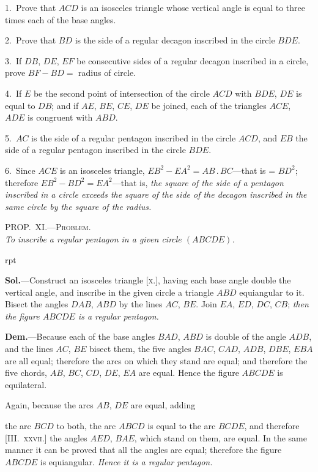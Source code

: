 \documentclass[oneside]{book}
\newcounter{wrapwidth}
\newcommand\myprop[2]{
\bigskip\Needspace*{4\baselineskip}\begin{center}\textsc{#1}\\\medskip\emph{#2}\par\end{center}
}
\newcommand\imgflow[3]{
\setcounter{wrapwidth}{#1}

\begin{wrapfigure}[#2]{r}{\value{wrapwidth}pt}
\begin{center}
\vspace{-0.3in}

\end{center}
\end{wrapfigure}
}
\begin{document}
\begin{footnotesize}
1.~Prove that $ACD$ is an isosceles triangle whose vertical angle
is equal to three times each of the base angles.

2.~Prove that $BD$ is the side of a regular decagon inscribed in
the circle $BDE$.

3.~If $DB$, $DE$, $EF$ be consecutive sides of a regular decagon
inscribed in a circle, prove $BF - BD =$ radius of circle.

4.~If $E$ be the second point of intersection of the circle $ACD$
with $BDE$, $DE$ is equal to $DB$; and if $AE$, $BE$, $CE$, $DE$ be
joined, each of the triangles $ACE$, $ADE$ is congruent with $ABD$.

5.~$AC$ is the side of a regular pentagon inscribed in the circle
$ACD$, and $EB$ the side of a regular pentagon inscribed in the
circle $BDE$.

6.~Since $ACE$ is an isosceles triangle, $EB^{2} - EA^{2} = AB\,.\,BC$---that
is = $BD^{2}$; therefore $EB^{2} - BD^{2} = EA^{2}$---that is, \textit{the square
of the side of a pentagon inscribed in a circle exceeds the square of
the side of the decagon inscribed in the same circle by the square of
the radius.}
\par\end{footnotesize}

\myprop{PROP\@.~XI\@.---Problem.}{To inscribe a regular pentagon in a given circle $(ABCDE)$.}


\imgflow{130}{11}{f163}

\textbf{Sol.}---Construct an isosceles triangle [\textsc{x.}], having
each base angle double the vertical
angle, and inscribe in the
given circle a triangle $ABD$
equiangular to it. Bisect the
angles $DAB$, $ABD$ by the lines
$AC$, $BE$. Join $EA$, $ED$, $DC$,
$CB$; \emph{then the figure $ABCDE$ is
a regular pentagon.}

\textbf{Dem.}---Because each of the
base angles $BAD$, $ABD$ is
double of the angle $ADB$, and the lines $AC$, $BE$ bisect
them, the five angles $BAC$, $CAD$, $ADB$, $DBE$, $EBA$ are
all equal; therefore the arcs on which they stand are
equal; and therefore the five chords, $AB$, $BC$, $CD$, $DE$,
$EA$ are equal. Hence the figure $ABCDE$ is equilateral.

Again, because the arcs $AB$, $DE$ are equal, adding

the arc $BCD$ to both, the arc $ABCD$ is equal to the arc
$BCDE$, and therefore [III\@.~\textsc{xxvii.}] the angles $AED$,
$BAE$, which stand on them, are equal. In the same
manner it can be proved that all the angles are equal;
therefore the figure $ABCDE$ is equiangular. \emph{Hence it
is a regular pentagon.}
\end{document}
